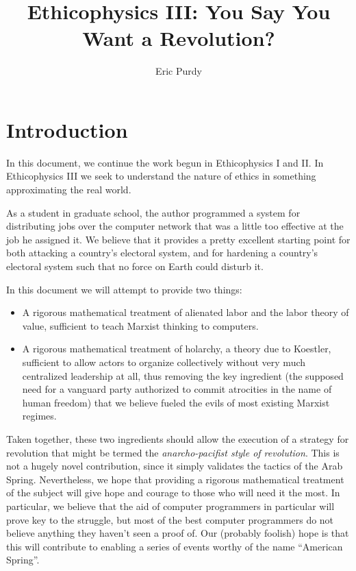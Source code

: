 \documentclass{article}
\title{Ethicophysics III: You Say You Want a Revolution?}
\author{Eric Purdy}
\begin{document}
\maketitle

\begin{abstract}
\end{abstract}

\section{Introduction}

In this document, we continue the work begun in Ethicophysics I and
II. In Ethicophysics III we seek to understand the nature of ethics in
something approximating the real world.

As a student in graduate school, the author programmed a system for
distributing jobs over the computer network that was a little too
effective at the job he assigned it. We believe that it provides a
pretty excellent starting point for both attacking a country's
electoral system, and for hardening a country's electoral system such
that no force on Earth could disturb it.

In this document we will attempt to provide two things:
\begin{itemize}
  \item A rigorous mathematical treatment of alienated labor and the
    labor theory of value, sufficient to teach Marxist thinking to
    computers.
  \item A rigorous mathematical treatment of holarchy, a theory due to
    Koestler, sufficient to allow actors to organize collectively
    without very much centralized leadership at all, thus removing the
    key ingredient (the supposed need for a vanguard party authorized
    to commit atrocities in the name of human freedom) that we believe
    fueled the evils of most existing Marxist regimes.
\end{itemize}
Taken together, these two ingredients should allow the execution of a
strategy for revolution that might be termed the {\em anarcho-pacifist
  style of revolution}. This is not a hugely novel contribution, since
it simply validates the tactics of the Arab Spring. Nevertheless, we
hope that providing a rigorous mathematical treatment of the subject
will give hope and courage to those who will need it the most. In
particular, we believe that the aid of computer programmers in
particular will prove key to the struggle, but most of the best
computer programmers do not believe anything they haven't seen a proof
of. Our (probably foolish) hope is that this will contribute to
enabling a series of events worthy of the name ``American Spring''.
\end{document}
